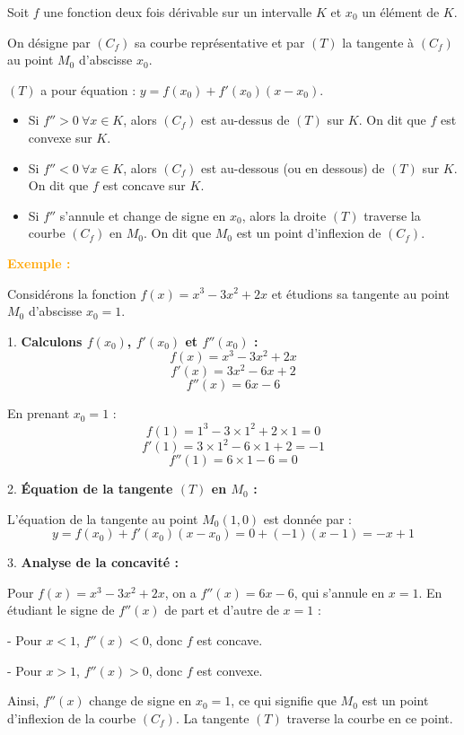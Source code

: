 \documentclass{article}
\newcounter{exemple}
\newcommand{\exemple}{%
  \refstepcounter{exemple}%
  \textbf{\textcolor{orange}{Exemple \theexemple : }} \ignorespaces
}
\begin{document}
Soit $f$ une fonction deux fois dérivable sur un intervalle $K$ et $x_0$ un élément de $K$. 

On désigne par $(C_f)$ sa courbe représentative et par $(T)$ la tangente à $(C_f)$ au point $M_0$ d’abscisse $x_0$.

$(T)$ a pour équation : $y = f(x_0) + f'(x_0)(x - x_0)$.

\begin{itemize}
    \item Si $f'' > 0 \ \forall x \in K$, alors $(C_f)$ est au-dessus de $(T)$ sur $K$. On dit que $f$ est convexe sur $K$.
    \item Si $f'' < 0 \ \forall x \in K$, alors $(C_f)$ est au-dessous (ou en dessous) de $(T)$ sur $K$. On dit que $f$ est concave sur $K$.
    \item Si $f''$ s'annule et change de signe en $x_0$, alors la droite $(T)$ traverse la courbe $(C_f)$ en $M_0$. On dit que $M_0$ est un point d’inflexion de $(C_f)$.
\end{itemize}

\textbf{\exemple}

Considérons la fonction \( f(x) = x^3 - 3x^2 + 2x \) et étudions sa tangente au point \( M_0 \) d'abscisse \( x_0 = 1 \).

1. \textbf{Calculons \( f(x_0) \), \( f'(x_0) \) et \( f''(x_0) \) :}
   \[
   f(x) = x^3 - 3x^2 + 2x
   \]
   \[
   f'(x) = 3x^2 - 6x + 2
   \]
   \[
   f''(x) = 6x - 6
   \]

   En prenant \( x_0 = 1 \) :
   \[
   f(1) = 1^3 - 3 \times 1^2 + 2 \times 1 = 0
   \]
   \[
   f'(1) = 3 \times 1^2 - 6 \times 1 + 2 = -1
   \]
   \[
   f''(1) = 6 \times 1 - 6 = 0
   \]

2. \textbf{Équation de la tangente \( (T) \) en \( M_0 \) :}

   L'équation de la tangente au point \( M_0(1, 0) \) est donnée par :
   \[
   y = f(x_0) + f'(x_0)(x - x_0) = 0 + (-1)(x - 1) = -x + 1
   \]

3. \textbf{Analyse de la concavité :}

   Pour \( f(x) = x^3 - 3x^2 + 2x \), on a \( f''(x) = 6x - 6 \), qui s'annule en \( x = 1 \). En étudiant le signe de \( f''(x) \) de part et d'autre de \( x = 1 \) :
   
   - Pour \( x < 1 \), \( f''(x) < 0 \), donc \( f \) est concave.
   
   - Pour \( x > 1 \), \( f''(x) > 0 \), donc \( f \) est convexe.

   Ainsi, \( f''(x) \) change de signe en \( x_0 = 1 \), ce qui signifie que \( M_0 \) est un point d'inflexion de la courbe \( (C_f) \). La tangente \( (T) \) traverse la courbe en ce point.
\end{document}

